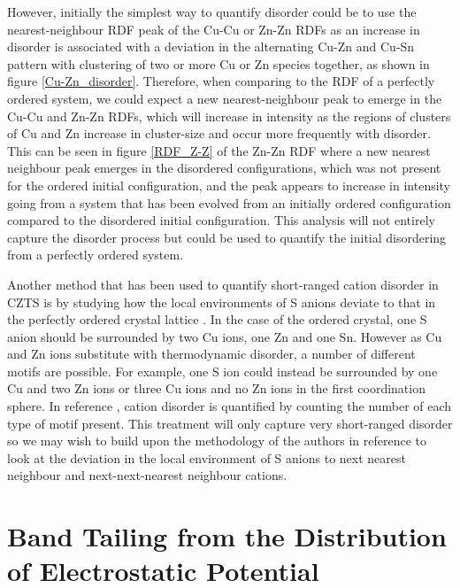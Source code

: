 However, initially the simplest way to quantify disorder could be to use the nearest-neighbour RDF peak of the Cu-Cu or Zn-Zn RDFs as an increase in disorder is associated with a deviation in the alternating Cu-Zn and Cu-Sn pattern with clustering of two or more Cu or Zn species together, as shown in figure \ref{Cu-Zn_disorder}. Therefore, when comparing to the RDF of a perfectly ordered system, we could expect a new nearest-neighbour peak to emerge in the Cu-Cu and Zn-Zn RDFs, which will increase in intensity as the regions of clusters of Cu and Zn increase in cluster-size and occur more frequently with disorder. This can be seen in figure \ref{RDF_Z-Z} of the Zn-Zn RDF where a new nearest neighbour peak emerges in the disordered configurations, which was not present for the ordered initial configuration, and the peak appears to increase in intensity going from a system that has been evolved from an initially ordered configuration compared to the disordered initial configuration. This analysis will not entirely capture the disorder process but could be used to quantify the initial disordering from a perfectly ordered system.

Another method that has been used to quantify short-ranged cation disorder in CZTS is by studying how the local environments of S anions deviate to that in the perfectly ordered crystal lattice \cite{Lany_CZTS}. In the case of the ordered crystal, one S anion should be surrounded by two Cu ions, one Zn and one Sn. However as Cu and Zn ions substitute with thermodynamic disorder, a number of different motifs are possible. For example, one S ion could instead be surrounded by one Cu and two Zn ions or three Cu ions and no Zn ions in the first coordination sphere. In reference , cation disorder is quantified by counting the number of each type of motif present.
This treatment will only capture very short-ranged disorder so we may wish to build upon the methodology of the authors in reference  to look at the deviation in the local environment of S anions to next nearest neighbour and next-next-nearest neighbour cations.




\section{Band Tailing from the Distribution of Electrostatic Potential}\label{band_tail_methods}

